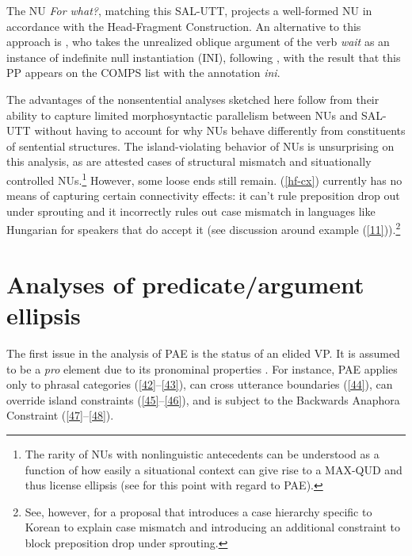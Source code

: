 \documentclass[output=paper
	        ,collection
	        ,collectionchapter
 	        ,biblatex
                ,babelshorthands
                ,newtxmath
                ,draftmode
                ,colorlinks, citecolor=brown
]{langscibook}
\begin{document}
{%
\z
%
The NU \textit{For what?}, matching this SAL-UTT,
projects a well-formed NU in accordance with the Head-Fragment Construction. An alternative to this approach is \citet{Kim2015}, who takes the unrealized oblique argument of the verb \textit{wait} as an instance of indefinite null instantiation (INI), following \citep[see][]{Ruppenhofer2014}, with the result that this PP appears on the COMPS list with the annotation \textit{ini}.

The advantages of the nonsentential analyses sketched here follow from their ability to capture limited morphosyntactic parallelism between NUs and SAL-UTT without having to account for why NUs behave differently from constituents of sentential structures. The island-violating behavior of NUs is unsurprising on this analysis, as are attested cases of structural mismatch and situationally controlled NUs.\footnote{The rarity of NUs with nonlinguistic antecedents can be understood as a function of how easily a situational context can give rise to a MAX-QUD and thus license ellipsis (see \citealt{Miller2014b} for this point with regard to PAE).} However, some loose ends still remain. (\ref{hf-cx}) currently has no means of capturing certain connectivity effects: it can't rule preposition drop out under sprouting and it incorrectly rules out case mismatch in languages like Hungarian for speakers that do accept it (see discussion around example (\ref{11})).\footnote{See, however, \citet{Kim2015} for a proposal that introduces  a case hierarchy specific to Korean to explain case mismatch and introducing an additional constraint to block preposition drop under sprouting.}
%



\section{Analyses of predicate/argument ellipsis}
\label{sec-analyses-of-pred-ellipsis}
The first issue in the analysis of PAE is the status of an elided VP. It is assumed to be a \textit{pro} element due to its pronominal properties \citep[see][]{Lobeck1995, Lopez2000, Kim2006, Aelbrecht2015, Ginzburg2018}. For instance, PAE applies only to phrasal categories (\ref{42}--\ref{43}),
can cross utterance boundaries (\ref{44}), can override island constraints (\ref{45}--\ref{46}), and is subject to the Backwards Anaphora Constraint (\ref{47}--\ref{48}).

}
\end{document}
